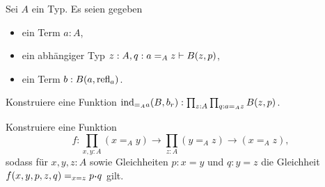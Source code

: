\documentclass{uebung}
\begin{document}

\begin{exercise}
  Sei $A$ ein Typ.
  Es seien gegeben
  \begin{itemize}
    \item ein Term $a:A$,
    \item ein abhängiger Typ $z:A,q:a=_A z\vdash B(z,p)$,
    \item ein Term $b:B(a,\mathrm{refl}_a)$.
  \end{itemize}
  Konstruiere eine Funktion $\mathrm{ind}_{=_Aa}(B,b_r):\prod_{z:A}\prod_{q:a=_A z}B(z,p)$.
\end{exercise}

\begin{exercise}
    Konstruiere eine Funktion 
    $$
    f:\prod_{x,y:A}(x=_A y)\to\prod_{z:A}(y=_A z)\to(x=_A z),
    $$
    sodass für $x,y,z:A$ sowie Gleichheiten $p:x=y$ und $q:y=z$ die Gleichheit $f(x,y,p,z,q) =_{x=z} p\kon q$ gilt.
\end{exercise}
\end{document}
